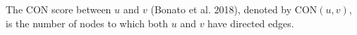 \documentclass[preview]{standalone}
\begin{document}
The CON score between $u$ and $v$ (Bonato et al. 2018), denoted by $\text{CON}(u, v)$, is the number of nodes to which both $u$ and $v$ have directed edges.\\
\end{document}
